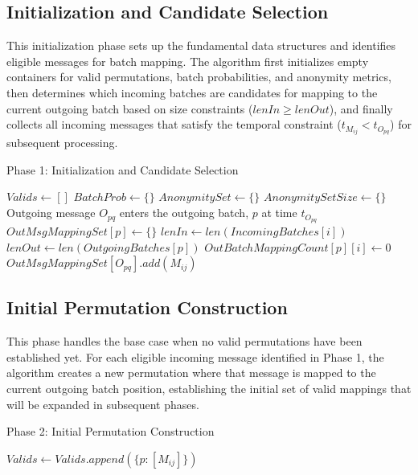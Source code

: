 \documentclass{article}
\begin{document}
\subsection{Initialization and Candidate Selection}

This initialization phase sets up the fundamental 
data structures and identifies eligible messages 
for batch mapping. The algorithm first initializes 
empty containers for valid permutations, 
batch probabilities, and anonymity metrics, 
then determines which incoming batches are 
candidates for mapping to the current outgoing 
batch based on size constraints ($lenIn \geq lenOut$), 
and finally collects all incoming messages that 
satisfy the temporal constraint ($t_{M_{ij}} < t_{O_{pq}}$) 
for subsequent processing.

\begin{algorithm}[H]
\caption*{Phase 1: Initialization and Candidate Selection}
\begin{algorithmic}[1]
\State $Valids \gets [] $
\State $BatchProb \gets \{ \} $
\State $ AnonymitySet \gets \{ \} $
\State $ AnonymitySetSize \gets \{ \} $
\State Outgoing message $O_{pq}$ enters the outgoing batch, $p$ at time $t_{O_{pq}}$
\State $OutMsgMappingSet [p] \gets \{ \} $
    \State $ lenIn \gets len(IncomingBatches[i]) $
    \State $ lenOut \gets len(OutgoingBatches[p]) $
        \State $OutBatchMappingCount[p][i] \gets 0 $
    \EndIf
\EndFor
{}
            \State $ OutMsgMappingSet[O_{pq}].add(M_{ij}) $
        \EndIf
    \EndFor
\EndFor
\end{algorithmic}
\end{algorithm}

\subsection{Initial Permutation Construction}

This phase handles the base case when no valid 
permutations have been established yet. 
For each eligible incoming message identified 
in Phase 1, the algorithm creates a new permutation 
where that message is mapped to the current outgoing 
batch position, establishing the initial set of 
valid mappings that will be expanded in subsequent phases.


\begin{algorithm}[H]
\caption*{Phase 2: Initial Permutation Construction}
\begin{algorithmic}[1]
        \State $Valids \gets Valids.append(\{ p: [M_{ij}] \} )$
    \EndFor
\EndIf
\end{algorithmic}
\end{algorithm}
\end{document}
